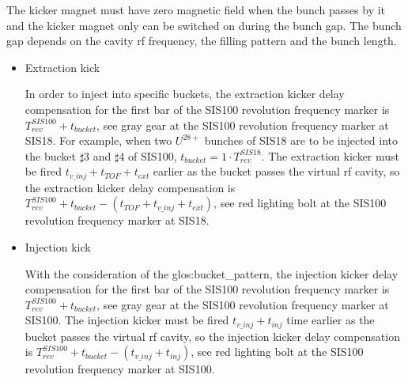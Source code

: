 
The kicker magnet must have zero magnetic field when the bunch passes by it and the kicker magnet only can be switched on during the bunch gap. The bunch gap depends on the cavity rf frequency, the filling pattern and the bunch length. 

\begin{itemize}
\item Extraction kick

In order to inject into specific buckets, the extraction kicker delay compensation for the first bar of the SIS100 revolution frequency marker is $T_{\mathit{rev}}^{\mathit{SIS100}} + t_{\mathit{bucket}}$, see gray gear at the SIS100 revolution frequency marker at SIS18. For example, when two $U^{28+}$ bunches of SIS18 are to be injected into the bucket $\sharp3$ and $\sharp4$ of SIS100, $t_{\mathit{bucket}} =1 \cdot T_{\mathit{rev}}^{\mathit{SIS18}}$. The extraction kicker must be fired $t_{\mathit{v\_inj}}+t_{\mathit{TOF}}+t_{\mathit{ext}}$ earlier as the bucket passes the virtual rf cavity, so the extraction kicker delay compensation is $T_{\mathit{rev}}^{\mathit{SIS100}} + t_{\mathit{bucket}} - (t_{\mathit{TOF}} + t_{\mathit{v\_inj}} + t_{\mathit{ext}})$, see red lighting bolt at the SIS100 revolution frequency marker at SIS18. 

\item Injection kick

With the consideration of the \gls{glos:bucket_pattern}, the injection kicker delay compensation for the first bar of the SIS100 revolution frequency marker is $T_{\mathit{rev}}^{\mathit{SIS100}} + t_{\mathit{bucket}}$, see gray gear at the SIS100 revolution frequency marker at SIS100. The injection kicker must be fired $t_{\mathit{v\_inj}}+t_{\mathit{inj}}$ time earlier as the bucket passes the virtual rf cavity, so the injection kicker delay compensation is $T_{\mathit{rev}}^{\mathit{SIS100}} + t_{\mathit{bucket}} - (t_{\mathit{v\_inj}} + t_{\mathit{inj}})$, see red lighting bolt at the SIS100 revolution frequency marker at SIS100.
\end{itemize}

